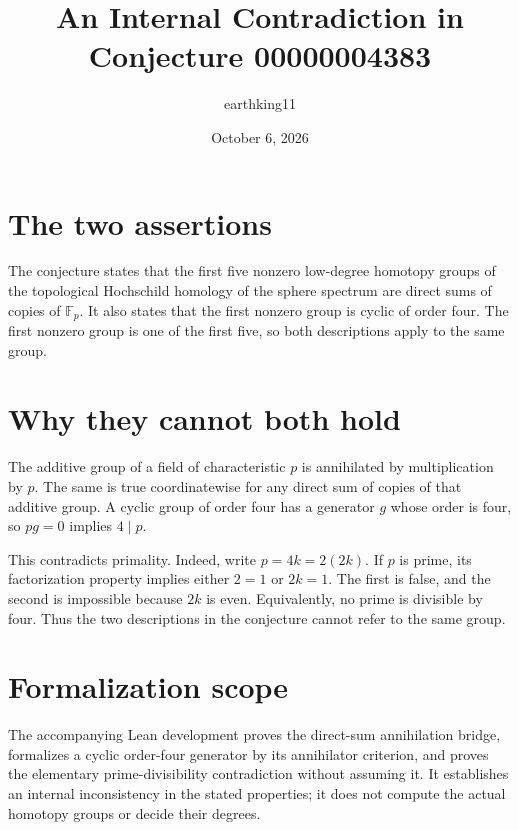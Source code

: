 \documentclass[11pt]{article}
\title{An Internal Contradiction in Conjecture 00000004383}
\author{earthking11}
\date{October 6, 2026}
\begin{document}
\maketitle

\section*{The two assertions}
The conjecture states that the first five nonzero low-degree homotopy groups of the topological Hochschild homology of the sphere spectrum are direct sums of copies of $\mathbb F_p$. It also states that the first nonzero group is cyclic of order four. The first nonzero group is one of the first five, so both descriptions apply to the same group.

\section*{Why they cannot both hold}
The additive group of a field of characteristic $p$ is annihilated by multiplication by $p$. The same is true coordinatewise for any direct sum of copies of that additive group. A cyclic group of order four has a generator $g$ whose order is four, so $p g=0$ implies $4\mid p$.

This contradicts primality. Indeed, write $p=4k=2(2k)$. If $p$ is prime, its factorization property implies either $2=1$ or $2k=1$. The first is false, and the second is impossible because $2k$ is even. Equivalently, no prime is divisible by four. Thus the two descriptions in the conjecture cannot refer to the same group.

\section*{Formalization scope}
The accompanying Lean development proves the direct-sum annihilation bridge, formalizes a cyclic order-four generator by its annihilator criterion, and proves the elementary prime-divisibility contradiction without assuming it. It establishes an internal inconsistency in the stated properties; it does not compute the actual homotopy groups or decide their degrees.
\end{document}
